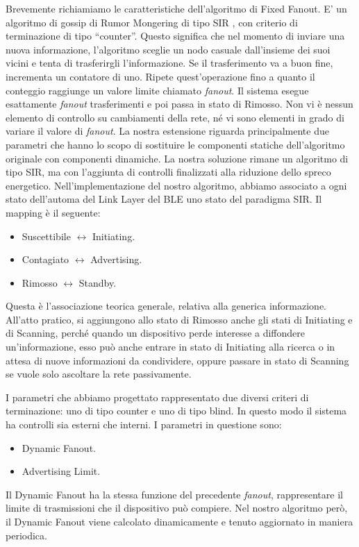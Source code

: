 Brevemente richiamiamo le caratteristiche dell'algoritmo di Fixed Fanout. E' un algoritmo di gossip di Rumor Mongering di tipo \acf{SIR} , con criterio di terminazione di tipo “counter”. Questo significa che nel momento di inviare una nuova informazione, l'algoritmo sceglie un nodo casuale dall'insieme dei suoi vicini e tenta di trasferirgli l'informazione. Se il trasferimento va a buon fine, incrementa un contatore di uno. Ripete quest'operazione fino a quanto il conteggio raggiunge un valore limite chiamato \textit{fanout}. Il sistema esegue esattamente \textit{fanout} trasferimenti e poi passa in stato di Rimosso. Non vi è nessun elemento di controllo su cambiamenti della rete, né vi sono elementi in grado di variare il valore di \textit{fanout}. La nostra estensione riguarda principalmente due parametri che hanno lo scopo di sostituire le componenti statiche dell'algoritmo originale con componenti dinamiche. La nostra soluzione rimane un algoritmo di tipo \acs{SIR}, ma con l'aggiunta di controlli finalizzati alla riduzione dello spreco energetico. Nell'implementazione del nostro algoritmo, abbiamo associato a ogni stato dell'automa del Link Layer del BLE uno stato del paradigma SIR. Il mapping è il seguente:
\begin{itemize}
	\item Suscettibile $ \longleftrightarrow $ Initiating.
	\item Contagiato $ \longleftrightarrow $ Advertising.
	\item Rimosso $ \longleftrightarrow $ Standby.
\end{itemize}
Questa è l'associazione teorica generale, relativa alla generica informazione. All'atto pratico, si aggiungono allo stato di Rimosso anche gli stati di Initiating e di Scanning, perché quando un dispositivo perde interesse a diffondere un'informazione, esso può anche entrare in stato di Initiating alla ricerca o in attesa di nuove informazioni da condividere, oppure passare in stato di Scanning se vuole solo ascoltare la rete passivamente.

I parametri che abbiamo progettato rappresentato due diversi criteri di terminazione: uno di tipo counter e uno di tipo blind. In questo modo il sistema ha controlli sia esterni che interni. I parametri in questione sono:
\begin{itemize}
	\item Dynamic Fanout.
	\item Advertising Limit.
\end{itemize}
Il Dynamic Fanout ha la stessa funzione del precedente \textit{fanout}, rappresentare il limite di trasmissioni che il dispositivo può compiere. Nel nostro algoritmo però, il Dynamic Fanout viene calcolato dinamicamente e tenuto aggiornato in maniera periodica.

